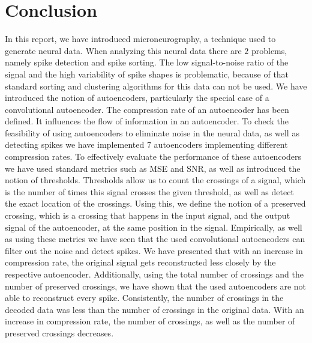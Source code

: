 \section{Conclusion}
\label{sec:conclusion}
In this report, we have introduced microneurography, a technique used to generate neural data.
When analyzing this neural data there are $2$ problems, namely spike detection and spike sorting.
The low signal-to-noise ratio of the signal and the high variability of spike shapes is problematic, because of that standard sorting and clustering algorithms for this data can not be used.
We have introduced the notion of autoencoders, particularly the special case of a convolutional autoencoder.
The compression rate of an autoencoder has been defined. It influences the flow of information in an autoencoder.
To check the feasibility of using autoencoders to eliminate noise in the neural data, as well as detecting spikes we have implemented $7$ autoencoders implementing different compression rates.
To effectively evaluate the performance of these autoencoders we have used standard metrics such as MSE and SNR, as well as introduced the notion of thresholds.
Thresholds allow us to count the crossings of a signal, which is the number of times this signal crosses the given threshold, as well as detect the exact location of the crossings.
Using this, we define the notion of a preserved crossing, which is a crossing that happens in the input signal, and the output signal of the autoencoder, at the same position in the signal.
Empirically, as well as using these metrics we have seen that the used convolutional autoencoders can filter out the noise and detect spikes.
We have presented that with an increase in compression rate, the original signal gets reconstructed less closely by the respective autoencoder.
Additionally, using the total number of crossings and the number of preserved crossings, we have shown that the used autoencoders are not able to reconstruct every spike.
Consistently,  the number of crossings in the decoded data was less than the number of crossings in the original data.
With an increase in compression rate, the number of crossings, as well as the number of preserved crossings decreases.

